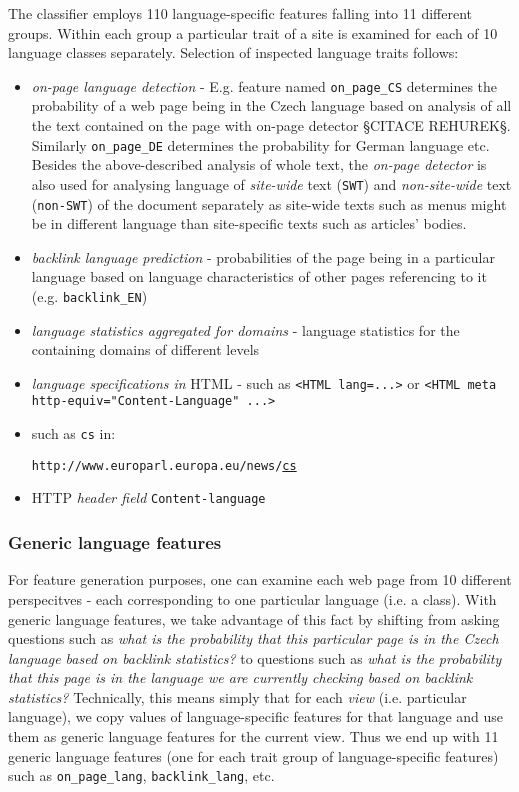 \documentclass{acm_proc_article-sp}
\begin{document}
{  The classifier employs 110 language-specific features falling into 11 different  groups. Within each group a
  particular trait of a site is examined for each of 10 language classes separately. Selection of
  inspected language traits follows: 
  \begin{itemize}
    \item \textit{on-page language detection} - E.g. feature named \texttt{on\_page\_CS} determines the
      probability of a web page being in the Czech language based on analysis of all the text
      contained on the page with on-page detector §CITACE REHUREK§. Similarly \texttt{on\_page\_DE} determines the
      probability for German language etc. Besides the above-described analysis of whole text, the \textit{on-page 
      detector} is also used for analysing language of \textit{site-wide} text (\texttt{SWT}) and
    \textit{non-site-wide} text (\texttt{non-SWT}) of the document separately as site-wide texts 
      such as menus might be in different language than site-specific texts such as articles' bodies.
    \item \textit{backlink language prediction} - probabilities of the page being in a particular
      language based on language characteristics of other pages referencing to it (e.g.
      \texttt{backlink\_EN})
    \item \textit{language statistics aggregated for domains} - language statistics for the
      containing domains of different levels
    \item \textit{language specifications in} HTML - such as \texttt{<HTML lang=...>} or \texttt{<HTML
      meta http-equiv="Content-Language"  ...>}
    \item {} such as \texttt{cs} in:

    \texttt{http://www.europarl.europa.eu/news/}\underline{\texttt{cs}} 
    \item HTTP \textit{header field} \texttt{Content-language}
  \end{itemize}


 \subsubsection{Generic language features}
    For feature generation purposes, one can examine each web page from 10 different perspecitves -
    each corresponding to one particular language (i.e. a class). With generic language features, we
    take advantage of this fact by shifting from asking questions such as \textit{what is the probability that 
    this particular page is in the Czech language based on backlink statistics?} to questions 
    such as \textit{what is the probability that this page is in the language we are currently checking 
    based on backlink statistics?} Technically, this means simply
    that for each \textit{view} (i.e. particular language), we copy values of language-specific
    features for that language and use them as generic language features for the current view. Thus
    we end up with 11 generic language features (one for each trait group of language-specific
    features) such as \texttt{on\_page\_lang}, \texttt{backlink\_lang}, etc.
}
\end{document}
